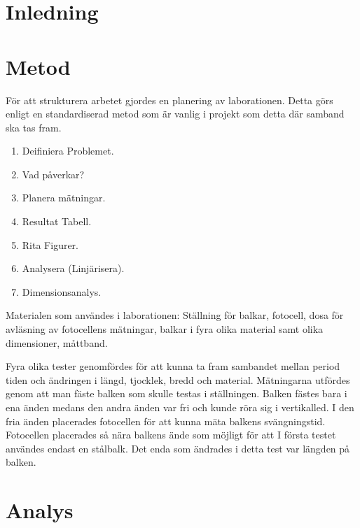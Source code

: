 \documentclass[10pt, titlepage, oneside, a4paper]{article}
\begin{document}
	\section{Inledning}
	\section{Metod}
    För att strukturera arbetet gjordes en planering av laborationen. Detta görs enligt en standardiserad metod som är vanlig i projekt som detta där samband ska tas fram.
    \begin{enumerate}
        \item Deifiniera Problemet.
        \item Vad påverkar?
        \item Planera mätningar.
        \item Resultat Tabell.
        \item Rita Figurer.
        \item Analysera (Linjärisera).
        \item Dimensionsanalys.
    \end{enumerate}

Materialen som användes i laborationen: Ställning för balkar, fotocell, dosa för avläsning av fotocellens mätningar, balkar i fyra olika material samt olika dimensioner, måttband.

 Fyra olika tester genomfördes för att kunna ta fram sambandet mellan period tiden och ändringen i längd, tjocklek, bredd och material.
Mätningarna utfördes genom att man fäste balken som skulle testas i ställningen. Balken fästes bara i ena änden medans den andra änden var fri och kunde röra sig i vertikalled. I den fria änden placerades fotocellen för att kunna mäta balkens svängningstid. Fotocellen placerades så nära balkens ände som möjligt för att   I första testet användes endast en stålbalk. Det enda som ändrades i detta test var längden på balken.
    \section{Analys}
\end{document}
